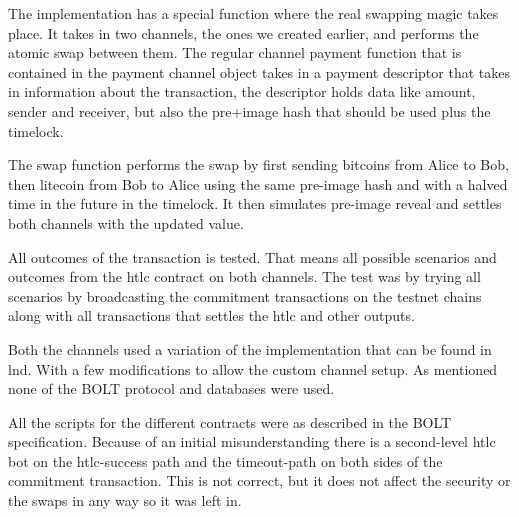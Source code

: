 The implementation has a special function where the real swapping magic takes place. 
It takes in two channels, the ones we created earlier, and performs the atomic swap between them.
The regular channel payment function that is contained in the payment channel object
takes in a payment descriptor that takes in information about the transaction, the 
descriptor holds data like amount, sender and receiver, but also the pre+image hash
that should be used plus the timelock.

The swap function performs the swap by first sending bitcoins from Alice to Bob, then litecoin 
from Bob to Alice using the same pre-image hash and with a halved time in the future in the timelock.
It then simulates pre-image reveal and settles both channels with the updated value.

All outcomes of the transaction is tested. That means all possible scenarios and outcomes from 
the htlc contract on both channels. The test was by trying all scenarios by broadcasting 
the commitment transactions on the testnet chains along with all transactions that settles the htlc
and other outputs. 

Both the channels used a variation of the implementation that can be found in lnd. With a few modifications
to allow the custom channel setup. As mentioned none of the BOLT protocol and databases were used. 

All the scripts for the different contracts were as described in the BOLT specification. 
Because of an initial misunderstanding there is a second-level htlc bot on the htlc-success path
and the timeout-path on both sides of the commitment transaction. This is not correct, but it
does not affect the security or the swaps in any way so it was left in.